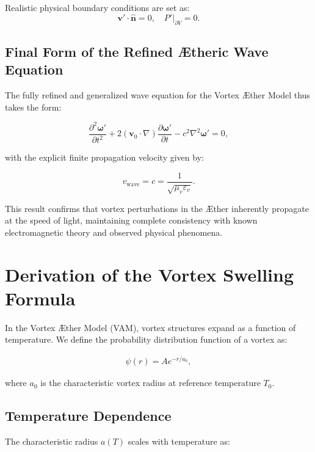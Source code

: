 \documentclass[a4paper,12pt]{article}
\begin{document}
Realistic physical boundary conditions are set as:
\begin{equation}
    \mathbf{v}' \cdot \hat{\mathbf{n}} = 0, \quad P'|_{\partial V} = 0.
\end{equation}


\subsection{Final Form of the Refined Ætheric Wave Equation}


The fully refined and generalized wave equation for the Vortex Æther Model thus takes the form:


\begin{equation}
    \frac{\partial^2 \boldsymbol{\omega}'}{\partial t^2}+2(\mathbf{v}_0\cdot\nabla)\frac{\partial\boldsymbol{\omega}'}{\partial t} - c^2\nabla^2\boldsymbol{\omega}' = 0,
\end{equation}


with the explicit finite propagation velocity given by:


\begin{equation}
    v_\text{wave} = c = \frac{1}{\sqrt{\mu_v \varepsilon_v}}.
\end{equation}


This result confirms that vortex perturbations in the Æther inherently propagate at the speed of light, maintaining complete consistency with known electromagnetic theory and observed physical phenomena.
\label{appendix:8}


\section{Derivation of the Vortex Swelling Formula}

In the Vortex Æther Model (VAM), vortex structures expand as a function of temperature. We define the probability distribution function of a vortex as:

\begin{align}
    \psi(r) = A e^{-r/a_0},
\end{align}

where \( a_0 \) is the characteristic vortex radius at reference temperature \( T_0 \).

\subsection{Temperature Dependence}
The characteristic radius \( a(T) \) scales with temperature as:
\end{document}
